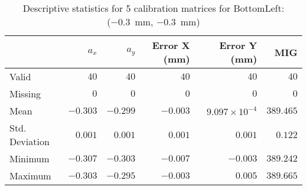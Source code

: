 \begin{table}[h]
    \begin{subtable}{\textwidth}
        \centering
        \footnotesize
        \begin{tabular}{lrrrrr}
            \toprule
                & $a_x$ & $a_y$ & Error X (mm) & Error Y (mm) & MIG  \\
            \midrule
            Valid & $40$ & $40$ & $40$ & $40$ & $40$  \\
            Missing & $0$ & $0$ & $0$ & $0$ & $0$  \\
            Mean & $-0.303$ & $-0.299$ & $-0.003$ & $9.097\times10^{-4}$ & $389.465$  \\
            Std. Deviation & $0.001$ & $0.001$ & $0.001$ & $0.001$ & $0.122$  \\
            Minimum & $-0.307$ & $-0.303$ & $-0.007$ & $-0.003$ & $389.242$  \\
            Maximum & $-0.303$ & $-0.295$ & $-0.003$ & $0.005$ & $389.665$  \\
            \bottomrule
        \end{tabular}
        \caption{$T_{Avg}$}
        \end{subtable}

    \caption{Descriptive statistics for 5 calibration matrices for \textsf{BottomLeft:} (\SI{-0.3}{\milli\meter}, \SI{-0.3}{\milli\meter})}
    \label{table:stats_matrix_bottomleft}
\end{table}

